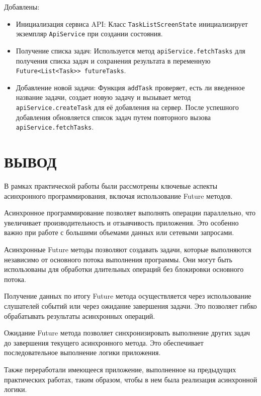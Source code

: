 Добавлены:

\begin{itemize}
	\item Инициализация сервиса API:
		Класс \texttt{TaskListScreenState} инициализирует
		экземпляр \texttt{ApiService} при создании состояния.
	\item Получение списка задач:
		Используется метод \texttt{apiService.fetchTasks}
		для получения списка задач и сохранения результата
		в переменную \texttt{Future<List<Task>> futureTasks}.
	\item Добавление новой задачи:
		Функция \texttt{addTask} проверяет,
		есть ли введенное название задачи,
		создает новую задачу и вызывает метод \texttt{apiService.createTask}
		для её добавления на сервер.
		После успешного добавления обновляется список задач
		путем повторного вызова \texttt{apiService.fetchTasks}.
\end{itemize}

\clearpage

\section*{ВЫВОД}

В рамках практической работы были рассмотрены ключевые
аспекты асинхронного программирования,
включая использование Future методов.\par
Асинхронное программирование позволяет выполнять операции параллельно,
что увеличивает производительность и отзывчивость приложения.
Это особенно важно при работе с большими объемами данных
или сетевыми запросами.\par
Асинхронные Future методы позволяют создавать задачи,
которые выполняются независимо от основного потока выполнения программы.
Они могут быть использованы для обработки длительных операций
без блокировки основного потока.\par
Получение данных по итогу Future метода осуществляется
через использование слушателей событий или через ожидание завершения задачи.
Это позволяет гибко обрабатывать результаты асинхронных операций.\par
Ожидание Future метода позволяет синхронизировать выполнение других задач
до завершения текущего асинхронного метода.
Это обеспечивает последовательное выполнение логики приложения.\par
Также переработали имеющееся приложение,
выполненное на предыдущих практических работах,
таким образом, чтобы в нем была реализация асинхронной логики.

